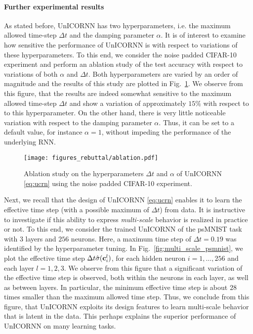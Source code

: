 \documentclass{article}
\newcommand{\bc}{{\bf c}}
\newcommand{\Dt}{{\Delta t}}
\newcommand{\fref}[1] {Fig.~\ref{#1}}
\begin{document}
\paragraph{Further experimental results}
As stated before, UnICORNN has two hyperparameters, i.e. the maximum allowed time-step $\Dt$ and the damping parameter $\alpha$. It is of interest to examine how sensitive the performance of UnICORNN is with respect to variations of these hyperparameters. To this end, we consider the noise padded CIFAR-10 experiment and perform an ablation study of the test accuracy with respect to variations of both $\alpha$ and $\Dt$. Both hyperparameters are varied by an order of magnitude and the results of this study are plotted in \fref{fig:ablation}. We observe from this figure, that the results are indeed somewhat sensitive to the maximum allowed time-step $\Dt$ and show a variation of approximately $15\%$ with respect to to this hyperparameter. On the other hand, there is very little noticeable variation with respect to the damping parameter $\alpha$. Thus, it can be set to a default value, for instance $\alpha =1$, without impeding the performance of the underlying RNN.  

\begin{figure}[ht]
\vskip 0.2in
\begin{center}
\centerline{\texttt{[image: figures\_rebuttal/ablation.pdf]}}
\caption{Ablation study on the hyperparameters $\Dt$ and $\alpha$ of UnICORNN \eqref{eq:ucrn} using the noise padded CIFAR-10 experiment.}
\label{fig:ablation}
\end{center}
\vskip -0.2in
\end{figure}
Next, we recall that the design of UnICORNN \eqref{eq:ucrn} enables it to learn the effective time step (with a possible maximum of $\Dt$) from data. It is instructive to investigate if this ability to express \emph{multi-scale} behavior is realized in practice or not. To this end, we consider the trained UnICORNN of the psMNIST task with $3$ layers and $256$ neurons. Here, a maximum time step of $\Dt =0.19$ was identified by the hyperparameter tuning. In \fref{fig:multi_scale_psmnist}, we plot the effective time step  $\Dt\hat{\sigma}(\bc_i^l)$, for each hidden neuron $i=1,\dots,256$ and each layer $l=1,2,3$. We observe from this figure that a significant variation of the effective time step is observed, both within the neurons in each layer, as well as between layers. In particular, the minimum effective time step is about $28$ times smaller than the maximum allowed time step. Thus, we conclude from this figure, that UnICORNN exploits its design features to learn multi-scale behavior that is latent in the data. This perhaps explains the superior performance of UnICORNN on many learning tasks. 
\end{document}
